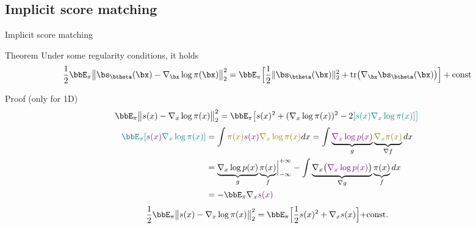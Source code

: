 \subsection{Implicit score matching}
\begin{frame}{Implicit score matching}
	\begin{block}{Theorem}
		Under some regularity conditions, it holds
		\vspace{-0.2cm}
		\[
		\frac{1}{2} \bbE_{\pi}\bigl\| \bs_{\btheta}(\bx) - \nabla_\bx \log \pi(\bx) \bigr\|^2_2 = \bbE_{\pi}\Bigr[ \frac{1}{2}\| \bs_{\btheta}(\bx) \|_2^2 + \text{tr}\bigl(\nabla_{\bx} \bs_{\btheta}(\bx)\bigr) \Bigr] + \text{const}
		\]
		\vspace{-0.6cm}
	\end{block}
	\begin{block}{Proof (only for 1D)}
		\vspace{-0.6cm}
		{\small
			\begin{multline*}
				\bbE_{\pi}\bigl\| s(x) - \nabla_x \log \pi(x) \bigr\|^2_2 = \bbE_{\pi} \bigl[ s(x)^2 + (\nabla_x \log \pi(x))^2 - 2{\color{teal}[s(x) \nabla_x \log \pi(x) ] \bigr] }
			\end{multline*}
			\vspace{-0.8cm}
			\begin{align*}
				{\color{teal}\bbE_{\pi} [{\color{violet}s(x) } \nabla_x \log \pi(x) ] } &= \int {\color{olive}\pi(x) {\color{violet}s(x)}  \nabla_x \log \pi(x)} d x 
				= \int \underbrace{\color{violet}\nabla_x \log p(x) }_{g} \underbrace{\color{olive}\nabla_x \pi(x) }_{\nabla f} dx \\
				& = \Bigl. \underbrace{\nabla_x \log p(x)}_{g} \underbrace{\pi(x)}_{f} \Bigr|_{-\infty}^{+\infty} - \int \underbrace{\nabla_x \bigl( {\color{violet}\nabla_x \log p(x)} \bigr)}_{\nabla g} \underbrace{\pi(x)}_{f} dx \\
				& = - \bbE_{\pi} \nabla_x {\color{violet}s(x)}
			\end{align*}
			\vspace{-0.4cm}
			\[
			\frac{1}{2} \bbE_{\pi}\bigl\| s(x) - \nabla_x \log \pi(x) \bigr\|^2_2 = \bbE_{\pi} \Bigr[\frac{1}{2} s(x)^2 + \nabla_x s(x) \Bigl]+ \text{const}.
			\]
		}
	\end{block}
\end{frame}

